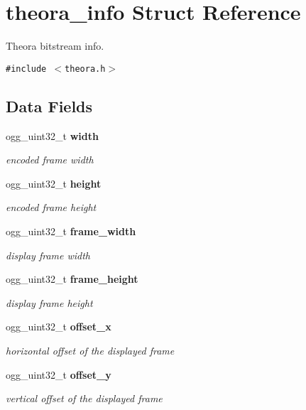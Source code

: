 \section{theora\_\-info Struct Reference}
\label{structtheora__info}
Theora bitstream info.  


{\tt \#include $<$theora.h$>$}

\subsection*{Data Fields}
\begin{CompactItemize}
\item 
ogg\_\-uint32\_\-t \bf{width}
\begin{CompactList}\small\item\em encoded frame width \item\end{CompactList}\item 
ogg\_\-uint32\_\-t \bf{height}
\begin{CompactList}\small\item\em encoded frame height \item\end{CompactList}\item 
ogg\_\-uint32\_\-t \bf{frame\_\-width}
\begin{CompactList}\small\item\em display frame width \item\end{CompactList}\item 
ogg\_\-uint32\_\-t \bf{frame\_\-height}
\begin{CompactList}\small\item\em display frame height \item\end{CompactList}\item 
ogg\_\-uint32\_\-t \bf{offset\_\-x}
\begin{CompactList}\small\item\em horizontal offset of the displayed frame \item\end{CompactList}\item 
ogg\_\-uint32\_\-t \bf{offset\_\-y}
\begin{CompactList}\small\item\em vertical offset of the displayed frame \item\end{CompactList}\item 

\end{CompactItemize}

